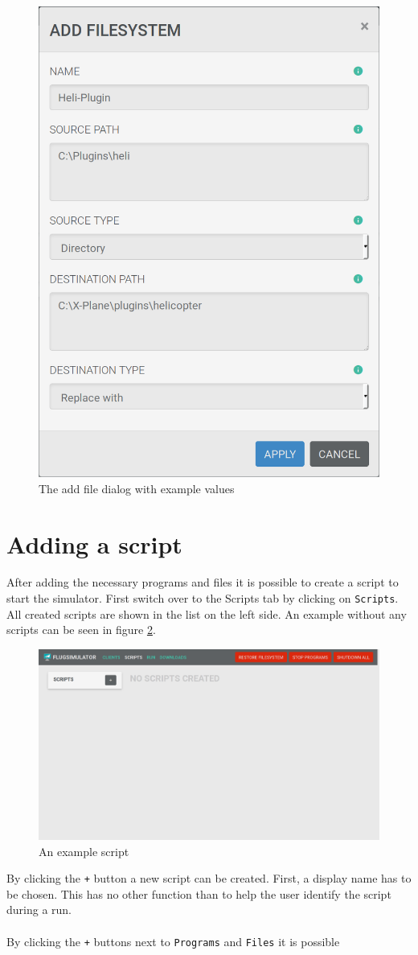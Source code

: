 \documentclass[accentcolor=tud1a, paper=a4, colorback]{tudreport}
\begin{document}
	\begin{figure}[h]
		\centering
		\includegraphics[width=.3\textwidth]{add_filesystem}
		\caption{The add file dialog with example values}
		\label{add_filesystem}
	\end{figure}

	\section{Adding a script}
	After adding the necessary programs and files it is possible to create a script
	to start the simulator.
	First switch over to the Scripts tab by clicking on \texttt{Scripts}.
	All created scripts are shown in the list on the left side. An example
	without any scripts can be seen in figure \ref{scriptpage_without_scripts}.
	\begin{figure}[H]
		\centering
		\includegraphics[width=.9\textwidth]{scriptpage_without_scripts}
		\caption{An example script}
		\label{scriptpage_without_scripts}
	\end{figure}
	By clicking the \texttt{+} button a new script can be created. First, a
	display name has to be chosen. This has no other function than to help
	the user identify the script during a run.
	\\\\
	By clicking the \texttt{+} buttons next to \texttt{Programs} and \texttt{Files} it is possible
\end{document}
